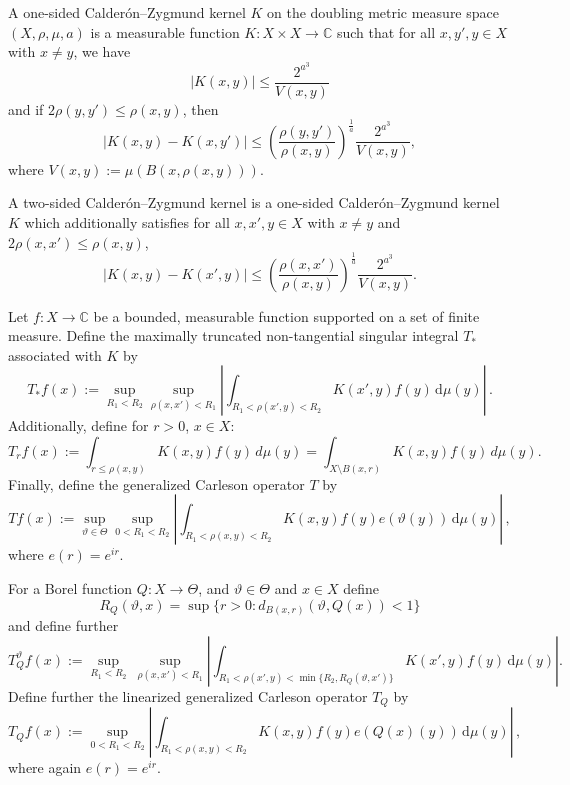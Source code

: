 \documentclass[12pt]{amsart}
\newcommand*{\complex}{\mathbb{C}} %
\theoremstyle{definition}
\theoremstyle{plain}
\def\C{\mathbb{C}}
\newcommand{\tQ}{{Q}}
\newcommand{\mfa}{{\vartheta}}
\newcommand{\Mf}{{\Theta}}
\begin{document}
A one-sided Calder\'on--Zygmund kernel $K$ on the doubling metric measure space $(X, \rho, \mu, a)$
is a measurable function $K\colon X\times X\to \complex$ such that for all $x,y',y\in X$ with $x\neq y$, we have
\begin{equation}\label{eqkernel-size}
    |K(x,y)| \leq \frac{2^{a^3}}{V(x,y)}
\end{equation}
and if $2\rho(y,y') \leq \rho(x,y)$, then
\begin{equation}
  \label{eqkernel-y-smooth}
  |K(x,y) - K(x,y')| \leq \left(\frac{\rho(y,y')}{\rho(x,y)}\right)^{\frac{1}{a}}\frac{2^{a^3}}{V(x,y)},
\end{equation}
where $V(x,y):=\mu(B(x,\rho(x,y)))$.

A two-sided Calder\'on--Zygmund kernel is a one-sided Calder\'on--Zygmund kernel $K$ which additionally satisfies for all $x,x',y\in X$ with $x\neq y$ and $2\rho(x,x') \leq \rho(x,y)$,
\begin{equation}
    \label{eqkernel-x-smooth}
    |K(x,y) - K(x',y)| \leq \left(\frac{\rho(x,x')}{\rho(x,y)}\right)^{\frac{1}{a}}\frac{2^{a^3}}{V(x,y)}.
\end{equation}

Let $f: X \to \C$ be a bounded, measurable function supported on a set of finite measure.
Define the maximally truncated non-tangential singular integral $T_{*}$ associated with $K$ by
\begin{equation}
    \label{def-tang-unm-op}
    T_{*}f(x):=\sup_{R_1 < R_2} \sup_{\rho(x,x')<R_1} \left|\int_{R_1< \rho(x',y) < R_2} K(x',y) f(y) \, \mathrm{d}\mu(y) \right|\,.
\end{equation}
Additionally, define for $r > 0$, $x\in X$:
\begin{equation}
\label{def-T-r}
T_r f(x):= \int_{r\le\rho(x,y)} K(x,y) f(y) \, d\mu(y) = \int_{X\setminus B(x,r)} K(x,y) f(y) \, d\mu(y).
\end{equation}
Finally, define the generalized Carleson operator $T$ by
\begin{equation}
    \label{def-main-op}
    Tf(x):=\sup_{\mfa\in\Mf} \sup_{0 < R_1 < R_2}\left| \int_{R_1 < \rho(x,y) < R_2} K(x,y) f(y) e(\mfa(y)) \, \mathrm{d}\mu(y) \right|\, ,
\end{equation}
where $e(r)=e^{ir}$.

For a Borel function $\tQ:X\to \Mf$, and $\mfa \in \Mf$ and $x\in X$ define
\begin{equation}
    R_{\tQ}(\mfa,x)=\sup\{r>0:d_{B(x,r)}(\mfa, \tQ(x))<1\}
\end{equation}
and define further
\begin{equation}
    \label{def-lin-star-op}
    T_{\tQ}^\mfa f(x):=\sup_{R_1<R_2} \ \sup_{\rho(x,x')<R_1}
    \left|\int_{R_1< \rho(x',y) < \min\{R_2, R_{\tQ}(\mfa,x')\}} K(x',y) f(y) \, \mathrm{d}\mu(y) \right|.
\end{equation}
Define further the linearized generalized Carleson operator $T_\tQ$ by
\begin{equation}
    \label{def-lin-main-op}
    T_\tQ f(x):= \sup_{0 < R_1 < R_2}\left| \int_{R_1 < \rho(x,y) < R_2} K(x,y) f(y) e(\tQ(x)(y)) \, \mathrm{d}\mu(y) \right|\, ,
\end{equation}
where again $e(r)=e^{ir}$.
\end{document}
